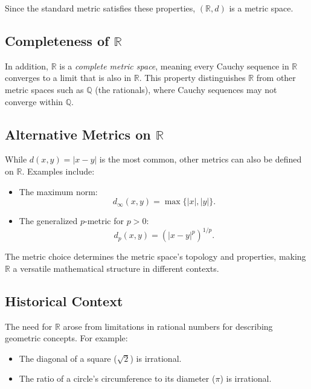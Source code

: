 Since the standard metric satisfies these properties, \( (\mathbb{R}, d) \) is a metric space.

\subsection{Completeness of \( \mathbb{R} \)}
In addition, \( \mathbb{R} \) is a \textit{complete metric space}, meaning every Cauchy sequence in \( \mathbb{R} \) converges to a limit that is also in \( \mathbb{R} \). This property distinguishes \( \mathbb{R} \) from other metric spaces such as \( \mathbb{Q} \) (the rationals), where Cauchy sequences may not converge within \( \mathbb{Q} \).

\subsection{Alternative Metrics on \( \mathbb{R} \)}
While \( d(x, y) = |x - y| \) is the most common, other metrics can also be defined on \( \mathbb{R} \). Examples include:

\begin{itemize}
    \item The maximum norm:
    \[
    d_\infty(x, y) = \max\{|x|, |y|\}.
    \]
    \item The generalized \( p \)-metric for \( p > 0 \):
    \[
    d_p(x, y) = (|x - y|^p)^{1/p}.
    \]
\end{itemize}

The metric choice determines the metric space's topology and properties, making \( \mathbb{R} \) a versatile mathematical structure in different contexts.

\subsection{Historical Context}
The need for \( \mathbb{R} \) arose from limitations in rational numbers for describing geometric concepts. For example:

\begin{itemize}
    \item The diagonal of a square (\( \sqrt{2} \)) is irrational.
    \item The ratio of a circle's circumference to its diameter (\( \pi \)) is irrational.
\end{itemize}

